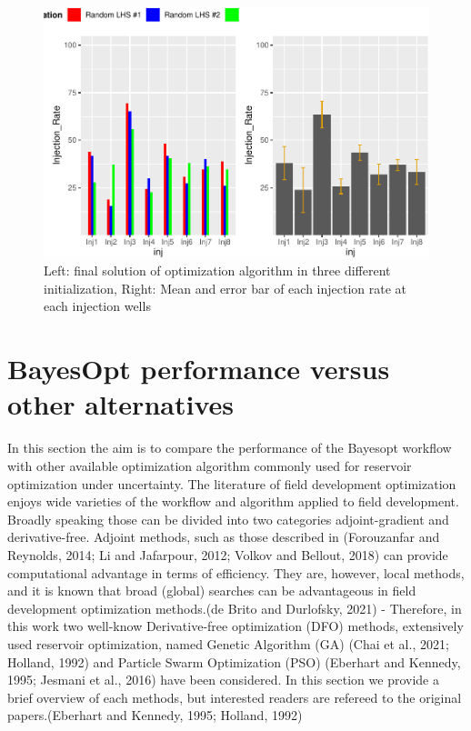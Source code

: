 \documentclass[]{elsarticle} %
\begin{document}
\begin{eqution}
\begin{figure}

{\centering \includegraphics[width=0.9\linewidth]{0_Paper1_main_files/figure-latex/diffu-1} 

}

\caption{Left: final solution of optimization algorithm in three different initialization, Right: Mean and error bar of each injection rate at each injection wells}\label{fig:diffu}
\end{figure}

\newpage

\newpage

\hypertarget{bayesopt-performance-versus-other-alternatives}{%
\section{BayesOpt performance versus other alternatives}\label{bayesopt-performance-versus-other-alternatives}}

In this section the aim is to compare the performance of the Bayesopt workflow with other available optimization algorithm commonly used for reservoir optimization under uncertainty. The literature of field development optimization enjoys wide varieties of the workflow and algorithm applied to field development. Broadly speaking those can be divided into two categories adjoint-gradient and derivative-free. Adjoint methods, such as those described in (Forouzanfar and Reynolds, 2014; Li and Jafarpour, 2012; Volkov and Bellout, 2018) can provide computational advantage in terms of efficiency. They are, however, local methods, and it is known that broad (global) searches can be advantageous in field development optimization methods.(de Brito and Durlofsky, 2021) - Therefore, in this work two well-know Derivative-free optimization (DFO) methods, extensively used reservoir optimization, named Genetic Algorithm (GA) (Chai et al., 2021; Holland, 1992) and Particle Swarm Optimization (PSO) (Eberhart and Kennedy, 1995; Jesmani et al., 2016) have been considered. In this section we provide a brief overview of each methods, but interested readers are refereed to the original papers.(Eberhart and Kennedy, 1995; Holland, 1992)


\end{eqution}
\end{document}
